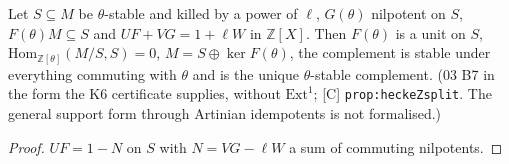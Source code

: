 \begin{lemma}\label{inf:heckez-split}
  \leanok
  Let $S\subseteq M$ be $\theta$-stable and killed by a power of $\ell$, $G(\theta)$ nilpotent on $S$, $F(\theta)M\subseteq S$ and $UF+VG=1+\ell W$ in
  $\mathbb Z[X]$. Then $F(\theta)$ is a unit on $S$, $\mathrm{Hom}_{\mathbb Z[\theta]}(M/S,S)=0$, $M=S\oplus\ker F(\theta)$, the complement is stable under
  everything commuting with $\theta$ and is the unique $\theta$-stable complement. (03 B7 in the form the K6 certificate supplies, without
  $\mathrm{Ext}^1$; [C] \texttt{prop:heckeZsplit}. The general support form through Artinian idempotents is not formalised.)
\end{lemma}
\begin{proof}
  \leanok
  $UF=1-N$ on $S$ with $N=VG-\ell W$ a sum of commuting nilpotents.
\end{proof}

